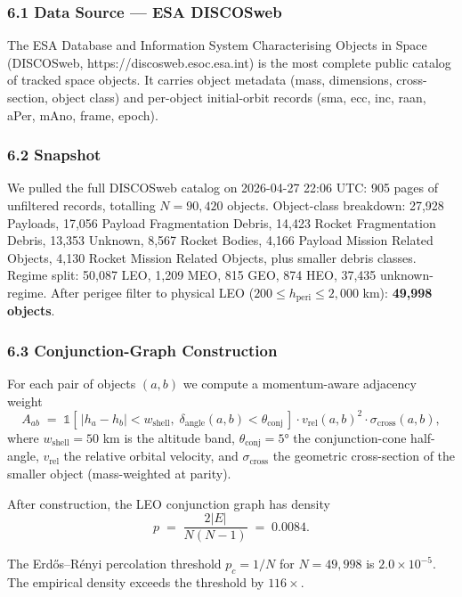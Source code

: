 \documentclass[
]{article}
\begin{document}
\subsubsection{6.1 Data Source --- ESA
DISCOSweb}\label{data-source-esa-discosweb}

The ESA Database and Information System Characterising Objects in Space
(DISCOSweb, https://discosweb.esoc.esa.int) is the most complete public
catalog of tracked space objects. It carries object metadata (mass,
dimensions, cross-section, object class) and per-object initial-orbit
records (sma, ecc, inc, raan, aPer, mAno, frame, epoch).

\subsubsection{6.2 Snapshot}\label{snapshot}

We pulled the full DISCOSweb catalog on 2026-04-27 22:06 UTC: 905 pages
of unfiltered records, totalling \(N = 90{,}420\) objects. Object-class
breakdown: 27,928 Payloads, 17,056 Payload Fragmentation Debris, 14,423
Rocket Fragmentation Debris, 13,353 Unknown, 8,567 Rocket Bodies, 4,166
Payload Mission Related Objects, 4,130 Rocket Mission Related Objects,
plus smaller debris classes. Regime split: 50,087 LEO, 1,209 MEO, 815
GEO, 874 HEO, 37,435 unknown-regime. After perigee filter to physical
LEO (\(200 \leq h_\text{peri} \leq 2{,}000\) km): \textbf{49,998
objects}.

\subsubsection{6.3 Conjunction-Graph
Construction}\label{conjunction-graph-construction}

For each pair of objects \((a, b)\) we compute a momentum-aware
adjacency weight
\[A_{ab} \;=\; \mathbb{1}\!\left[\,|h_a - h_b| < w_\text{shell},\; \delta_\text{angle}(a, b) < \theta_\text{conj}\,\right] \cdot v_\text{rel}(a, b)^2 \cdot \sigma_\text{cross}(a, b), \tag{6.1}\]
where \(w_\text{shell} = 50\) km is the altitude band,
\(\theta_\text{conj} = 5°\) the conjunction-cone half-angle,
\(v_\text{rel}\) the relative orbital velocity, and
\(\sigma_\text{cross}\) the geometric cross-section of the smaller
object (mass-weighted at parity).

After construction, the LEO conjunction graph has density
\[p \;=\; \frac{2|E|}{N(N-1)} \;=\; 0.0084. \tag{6.2}\]

The Erdős--Rényi percolation threshold \(p_c = 1/N\) for
\(N = 49{,}998\) is \(2.0 \times 10^{-5}\). The empirical density
exceeds the threshold by \textbf{\(116\times\)}.
\end{document}
